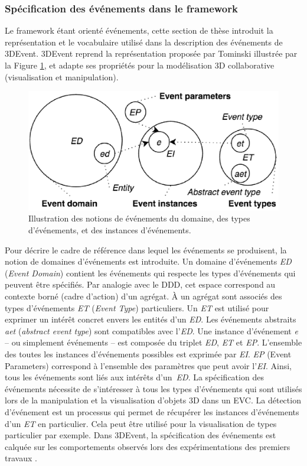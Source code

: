 \subsubsection{Spécification des événements dans le framework}
Le framework étant orienté événements, cette section de thèse introduit la 
représentation et 
le vocabulaire utilisé dans la description des événements de 3DEvent. 3DEvent 
reprend la représentation proposée par Tominski \cite{Doktor-ingenieur2006} 
illustrée par la Figure \ref{fig:representation_event}, et adapte ses propriétés pour 
la modélisation 3D collaborative (visualisation et manipulation). 

\begin{figure}[ht]
	\centering
	\includegraphics[width=0.7\columnwidth]{eps/event4.eps}
	\caption{Illustration des notions de événements du domaine, des types 
		d'événements, et des instances d'événements.}
	\label{fig:representation_event}
\end{figure} 

Pour décrire le cadre de référence dans lequel les événements se produisent, la 
notion de domaines d'événements est introduite. Un domaine d'événements 
\textit{ED} (\textit{Event Domain}) contient les événements qui respecte les types 
d'événements qui peuvent être spécifiés. Par analogie avec le \gls{DDD}, cet 
espace correspond au contexte borné (cadre d'action) d'un agrégat. À un agrégat 
sont associés des types d'événements \textit{ET} (\textit{Event Type}) particuliers. 
Un \textit{ET} est utilisé pour exprimer un intérêt concret envers les entités d'un 
\textit{ED}. 
Les événements abstraits \textit{aet} (\textit{abstract event type}) sont 
compatibles avec l'\textit{ED}. 
Une instance d'événement \textit{e} -- ou simplement 
événements -- est composée du triplet \textit{ED}, \textit{ET} et \textit{EP}. 
L'ensemble des toutes les instances d'événements possibles est exprimée par 
\textit{EI}. \textit{EP} (Event Parameters) correspond à l'ensemble des paramètres 
que peut avoir l'\textit{EI}. Ainsi, tous les événements sont liés aux intérêts 
d'un~\textit{ED}. La spécification des événements nécessite de 
s'intéresser à tous les types d'événements qui sont utilisés lors de la manipulation 
et la visualisation d'objets 3D dans un \gls{EVC}. La détection d'événement est un 
processus qui permet de récupérer les instances d'événements d'un \textit{ET} en 
particulier. Cela peut être utilisé pour la visualisation de types particulier par 
exemple. Dans 3DEvent, la spécification des événements est calquée sur les 
comportements observés lors des expérimentations des premiers travaux 
\cite{Desprat2015a, Desprat2015b}. 

